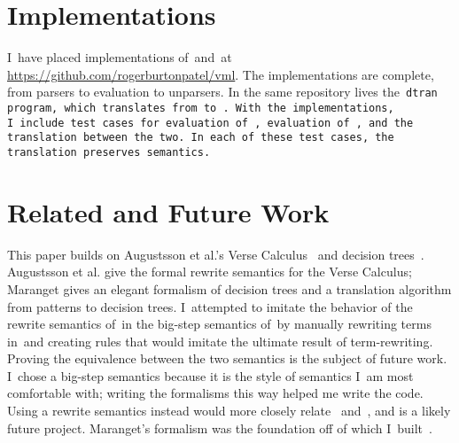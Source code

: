 \documentclass[manuscript,screen 12pt, nonacm]{acmart}
\begin{document}
        
    

    \section{Implementations}

    I~have placed implementations of~\VMinus and~\D at
    \url{https://github.com/rogerburtonpatel/vml}. The implementations are
    complete, from parsers to evaluation to unparsers. In the same repository
    lives the~\tt{dtran} program, which translates from~\VMinus to~\D. With the
    implementations, I~include test cases for
    evaluation of~\VMinus, evaluation
    of~\D, and the translation between the two. 
    In~each of these test cases, the translation preserves semantics. 


    \section{Related and Future Work}

    This paper builds on Augustsson et al.'s Verse Calculus~\citep{verse} and
    decision trees~\citep{maranget}. Augustsson et al. give the formal rewrite
    semantics for the Verse Calculus; Maranget gives an elegant formalism of
    decision trees and a translation algorithm from patterns to decision trees.
    I~attempted to imitate the behavior of the rewrite semantics of~\VC in the
    big-step semantics of~\VMinus by manually rewriting terms in~\VC and
    creating rules that would imitate the ultimate result of term-rewriting.
    Proving the equivalence between the two semantics is the subject of future
    work. I~chose a big-step semantics because it is the style of semantics I~am
    most comfortable with; writing the formalisms this way helped me write the
    code. Using a rewrite semantics instead would more closely relate~\VMinus
    and~\VC, and is a likely future project. Maranget's formalism was the
    foundation off of which I~built~\D. 
    
\end{document}
